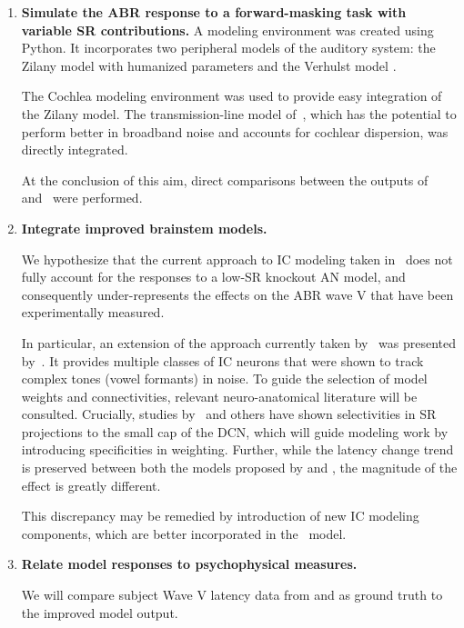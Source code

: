 \begin{enumerate}
	\item \textbf{Simulate the ABR response to a forward-masking task with variable SR contributions.}
	A modeling environment was created using Python.  It incorporates two peripheral models of the auditory system: the Zilany model with humanized parameters \citep{Zilany2014Updated} and the Verhulst model \citep{Verhulst2015Functional}.  

	The Cochlea modeling environment \citep{Rudnicki2014Cochlea} was used to provide easy integration of the Zilany model. The transmission-line model of~\cite{Verhulst2015Functional}, which has the potential to perform better in broadband noise and accounts for cochlear dispersion, was directly integrated.

	At the conclusion of this aim, direct comparisons between the outputs of~\cite{Zilany2014Updated} and~\cite{Verhulst2015Functional} were performed.

	\item \textbf{Integrate improved brainstem models.}  

	We hypothesize that the current approach to IC modeling taken in~\cite{Verhulst2015Functional} does not fully account for the responses to a low-SR knockout AN model, and consequently under-represents the effects on the ABR wave V that have been experimentally measured.  

	In particular, an extension of the approach currently taken by~\cite{Verhulst2015Functional} was presented by~\cite{Carney2015Speech}.  It provides multiple classes of IC neurons that were shown to track complex tones (vowel formants) in noise.  To guide the selection of model weights and connectivities, relevant neuro-anatomical literature will be consulted.  Crucially, studies by~\cite{Ryugo2008Projections} and others have shown selectivities in SR projections to the small cap of the DCN, which will guide modeling work by introducing specificities in weighting. Further, while the latency change trend is preserved between both the models proposed by \citeauthor{Zilany2014Updated} and \citeauthor{Verhulst2015Functional}, the magnitude of the effect is greatly different.  

	This discrepancy may be remedied by introduction of new IC modeling components, which are better incorporated in the~\cite{Zilany2014Updated} model.
	
	\item \textbf{Relate model responses to psychophysical measures.}  

	We will compare subject Wave V latency data from \citeauthor{Mehraei2015Individual} and \citeauthor{Mehraei2016Auditory} as ground truth to the improved model output.
	
	
\end{enumerate}
